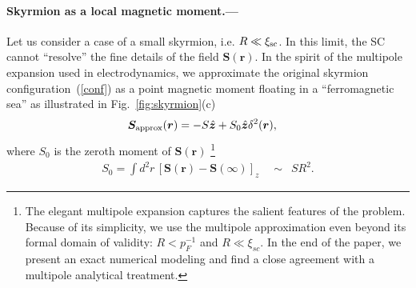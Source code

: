 \documentclass[twocolumn,showpacs,floatfix,longbibliography]{revtex4-1}
\begin{document}
\paragraph*{Skyrmion as a local magnetic moment.---} \label{sec:analytics}
Let us consider a case of a small skyrmion, i.e. $R\ll\xi_{\rm sc}$. In this limit, the SC cannot ``resolve'' the fine details of the field $\bm S(\bm r)$. In the spirit of the multipole expansion used in electrodynamics, we approximate the original skyrmion configuration~(\ref{conf}) as a point magnetic moment floating in a ``ferromagnetic sea'' as illustrated in Fig.~\ref{fig:skyrmion}(c)
\begin{align}
	\bm S_{\rm approx}(\bm r) & =  - S \hat{\bm z} + S_0 \hat{\bm z} \delta^2(\bm r),  \label{vr}
\end{align}
where $S_0$ is the zeroth moment of $\bm S(\bm r)$ \footnote{The elegant multipole expansion captures the salient features of the problem. Because of its simplicity, we use the multipole approximation even beyond its formal domain of validity: $R<p_F^{-1}$ and $R\ll \xi_{sc}$. In the end of the paper, we present an exact numerical modeling and find a close agreement with a multipole analytical treatment.}
\begin{align}
	S_0 = \int  d^2r \, \left[\bm S(\bm r)-\bm S(\infty)\right]_z  \quad \sim \,\,\,SR^2. \label{S0} 
\end{align}
\end{document}
